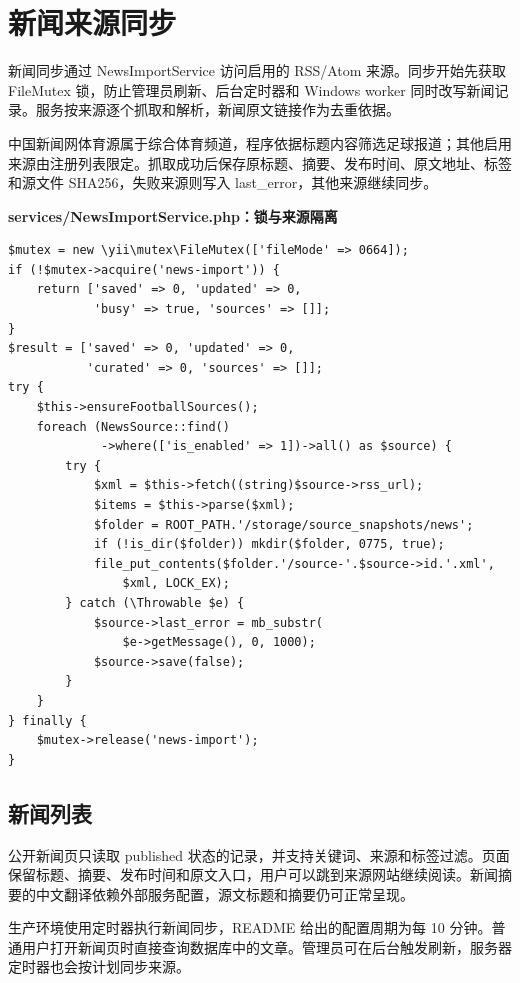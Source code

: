 \documentclass[UTF8,a4paper,11pt]{ctexart}
\begin{document}
\section{新闻来源同步}
新闻同步通过 NewsImportService 访问启用的 RSS/Atom 来源。同步开始先获取 FileMutex 锁，防止管理员刷新、后台定时器和 Windows worker 同时改写新闻记录。服务按来源逐个抓取和解析，新闻原文链接作为去重依据。

中国新闻网体育源属于综合体育频道，程序依据标题内容筛选足球报道；其他启用来源由注册列表限定。抓取成功后保存原标题、摘要、发布时间、原文地址、标签和源文件 SHA256，失败来源则写入 last\_error，其他来源继续同步。

\noindent\textbf{services/NewsImportService.php：锁与来源隔离}\par\vspace{2pt}
\begin{lstlisting}
$mutex = new \yii\mutex\FileMutex(['fileMode' => 0664]);
if (!$mutex->acquire('news-import')) {
    return ['saved' => 0, 'updated' => 0,
            'busy' => true, 'sources' => []];
}
$result = ['saved' => 0, 'updated' => 0,
           'curated' => 0, 'sources' => []];
try {
    $this->ensureFootballSources();
    foreach (NewsSource::find()
             ->where(['is_enabled' => 1])->all() as $source) {
        try {
            $xml = $this->fetch((string)$source->rss_url);
            $items = $this->parse($xml);
            $folder = ROOT_PATH.'/storage/source_snapshots/news';
            if (!is_dir($folder)) mkdir($folder, 0775, true);
            file_put_contents($folder.'/source-'.$source->id.'.xml',
                $xml, LOCK_EX);
        } catch (\Throwable $e) {
            $source->last_error = mb_substr(
                $e->getMessage(), 0, 1000);
            $source->save(false);
        }
    }
} finally {
    $mutex->release('news-import');
}
\end{lstlisting}
\subsection{新闻列表}
公开新闻页只读取 published 状态的记录，并支持关键词、来源和标签过滤。页面保留标题、摘要、发布时间和原文入口，用户可以跳到来源网站继续阅读。新闻摘要的中文翻译依赖外部服务配置，源文标题和摘要仍可正常呈现。

生产环境使用定时器执行新闻同步，README 给出的配置周期为每 10 分钟。普通用户打开新闻页时直接查询数据库中的文章。管理员可在后台触发刷新，服务器定时器也会按计划同步来源。
\end{document}
